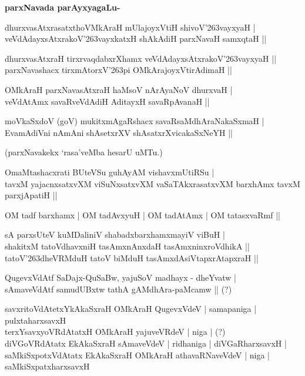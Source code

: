 {\bigskip
\noindent
{\large\bf parxNavada parAyxyagaLu-}}
\begin{itemize}
{\bf 
\item[1.] dhurxvasAtxrasatxthoVMkAraH mUlajoyxVtiH shivoV\char'263vayxyaH |\\\label{155}
veVdAdayxsAtxrakoV\char'263vayxkatxH shAkAdiH parxNavaH samxqtaH ||
\item[2.] dhurxvasAtxraH tirxrvaqdabxrXhamx veVdAdayxsAtxrakoV\char'263vayxyaH ||\\\label{155}
parxNavashacx tirxmAtorxV\char'263pi OMkArajoyxVtirAdimaH ||
\item[3.] OMkAraH parxNavasAtxraH haMsoV nArAyaNoV dhurxvaH |\\\label{155}
veVdAtAmx savaRveVdAdiH AditayxH savaRpAvanaH ||
\item[4.] moVkaSxdoV (goV) mukitxmAgaRshacx savaRsaMdhAraNakaSxmaH |\\
EvamAdiVni nAmAni shAsetxrXV shAsatxrXvicakaSxNeYH ||}
\end{itemize}
(parxNavakekx `rasa'veMba hesarU uMTu.)
\begin{itemize}
{\bf 
\item[5.] OmaMtashacxrati BUteVSu guhAyAM vishavxmUtiRSu |\\\label{156}
tavxM yajacnxsatxvXM viSuNxsatxvXM vaSaTAkxrasatxvXM barxhAmx tavxM parxjApatiH ||
\item[6.] OM tadf barxhamx | OM tadAvxyuH | OM tadAtAmx | OM tatasxvaRmf ||\label{156}
\item[7.] sA parxsUteV kuMDaliniV shabadxbarxhamxmayiV viBuH |\\
shakitxM tatoVdhavxniH tasAmxnAnxdaH tasAmxninxroVdhikA ||\\
tatoV\char'263dheVRMduH tatoV biMduH tasAmxdAsiVtapxrAtapxraH ||
\item[8.] QugevxVdAtf SaDajx-QuSaBw, yajuSoV madhayx - dheYvatw |\\\label{156}
sAmaveVdAtf samudUBxtw tathA gAMdhAra-paMcamw || (?)
\item[9.] savxritoVdAtetxYkAkaSxraH\label{156} OMkAraH QugevxVdeV | samapaniga | pulxtaharxsavxH \\
terxYsavxyoVRdAtatxH OMkAraH yajuveVRdeV | niga | (?)\\
diVGoVRdAtatx EkAkaSxraH sAmaveVdeV | ridhaniga | diVGaRharxsavxH |\\
saMkiSxpotxVdAtatx EkAkaSxraH OMkAraH athavaRNaveVdeV | niga |\\
saMkiSxpatxharxsavxH}
\end{itemize}

